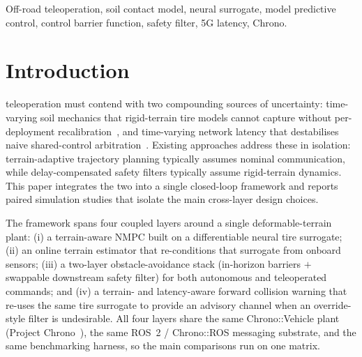 \documentclass[conference,letterpaper,10pt]{IEEEtran}
\begin{document}
\begin{IEEEkeywords}
Off-road teleoperation, soil contact model, neural surrogate, model
predictive control, control barrier function, safety filter, 5G latency, Chrono.
\end{IEEEkeywords}

\section{Introduction}
\label{sec:intro}

 teleoperation must contend with two
compounding sources of uncertainty: time-varying soil mechanics that
rigid-terrain tire models cannot capture without per-deployment
recalibration~\cite{Dallas21,Bekker69}, and time-varying network
latency that destabilises naive shared-control
arbitration~\cite{Choi23,Zhang25}. Existing approaches address these
in isolation: terrain-adaptive trajectory planning typically assumes
nominal communication, while delay-compensated safety filters
typically assume rigid-terrain dynamics. This paper integrates the two
into a single closed-loop framework and reports paired simulation
studies that isolate the main cross-layer design choices.

The framework spans four coupled layers around a single deformable-terrain
plant: (i) a terrain-aware NMPC built on a differentiable neural tire
surrogate; (ii) an online terrain estimator that re-conditions that
surrogate from onboard sensors; (iii) a two-layer obstacle-avoidance
stack (in-horizon barriers $+$ swappable downstream safety filter) for
both autonomous and teleoperated commands; and (iv) a terrain- and
latency-aware forward collision warning that re-uses the same tire
surrogate to provide an advisory channel when an override-style filter
is undesirable. All four layers share the same Chrono::Vehicle plant
(Project Chrono~\cite{Tasora16,Serban19}), the same ROS~2 / Chrono::ROS
messaging substrate, and
the same benchmarking harness, so the main comparisons run on one matrix.
\end{document}
